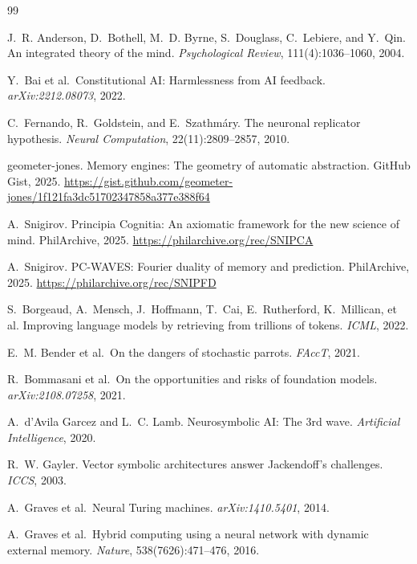 \documentclass[review]{elsarticle}
\begin{document}

\begin{thebibliography}{99}

J.~R. Anderson, D.~Bothell, M.~D. Byrne, S.~Douglass, C.~Lebiere, and Y.~Qin.
An integrated theory of the mind. \emph{Psychological Review}, 111(4):1036--1060, 2004.

Y.~Bai et al.\ Constitutional AI: Harmlessness from AI feedback. \emph{arXiv:2212.08073}, 2022.

C.~Fernando, R.~Goldstein, and E.~Szathm\'{a}ry.
The neuronal replicator hypothesis. \emph{Neural Computation}, 22(11):2809--2857, 2010.

geometer-jones. Memory engines: The geometry of automatic abstraction.
GitHub Gist, 2025. \url{https://gist.github.com/geometer-jones/1f121fa3dc51702347858a377e388f64}

A.~Snigirov. Principia Cognitia: An axiomatic framework for the new science of mind.
PhilArchive, 2025. \url{https://philarchive.org/rec/SNIPCA}

A.~Snigirov. PC-WAVES: Fourier duality of memory and prediction.
PhilArchive, 2025. \url{https://philarchive.org/rec/SNIPFD}

S.~Borgeaud, A.~Mensch, J.~Hoffmann, T.~Cai, E.~Rutherford, K.~Millican, et al.
Improving language models by retrieving from trillions of tokens. \emph{ICML}, 2022.

E.~M. Bender et al.\ On the dangers of stochastic parrots. \emph{FAccT}, 2021.

R.~Bommasani et al.\ On the opportunities and risks of foundation models. \emph{arXiv:2108.07258}, 2021.

A.~d'Avila Garcez and L.~C. Lamb. Neurosymbolic AI: The 3rd wave. \emph{Artificial Intelligence}, 2020.

R.~W. Gayler. Vector symbolic architectures answer Jackendoff's challenges. \emph{ICCS}, 2003.

A.~Graves et al.\ Neural Turing machines. \emph{arXiv:1410.5401}, 2014.

A.~Graves et al.\ Hybrid computing using a neural network with dynamic external memory. \emph{Nature}, 538(7626):471--476, 2016.


\end{thebibliography}
\end{document}
